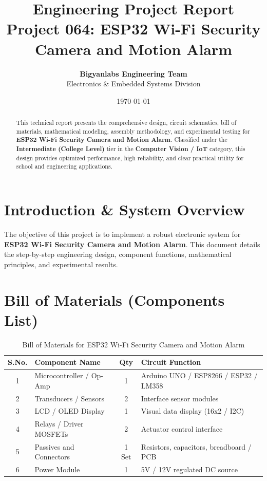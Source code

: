 \documentclass[11pt,a4paper]{article}
\title{\textbf{\Huge Engineering Project Report}\\[0.5em] \Large Project 064: ESP32 Wi-Fi Security Camera and Motion Alarm}
\author{\textbf{Bigyanlabs Engineering Team}\\ Electronics \& Embedded Systems Division}
\date{\today}
\begin{document}
\maketitle
\thispagestyle{empty}

\begin{abstract}
This technical report presents the comprehensive design, circuit schematics, bill of materials, mathematical modeling, assembly methodology, and experimental testing for \textbf{ESP32 Wi-Fi Security Camera and Motion Alarm}. Classified under the \textbf{Intermediate (College Level)} tier in the \textbf{Computer Vision / IoT} category, this design provides optimized performance, high reliability, and clear practical utility for school and engineering applications.
\end{abstract}

\newpage
\tableofcontents
\newpage

\section{Introduction \& System Overview}
The objective of this project is to implement a robust electronic system for \textbf{ESP32 Wi-Fi Security Camera and Motion Alarm}. This document details the step-by-step engineering design, component functions, mathematical principles, and experimental results.

\section{Bill of Materials (Components List)}
\begin{table}[h!]
\centering
\caption{Bill of Materials for ESP32 Wi-Fi Security Camera and Motion Alarm}
\vspace{0.5em}
\begin{tabular}{clcp{7cm}}
\toprule
\textbf{S.No.} & \textbf{Component Name} & \textbf{Qty} & \textbf{Circuit Function} \\
\midrule
1 & Microcontroller / Op-Amp & 1 & Arduino UNO / ESP8266 / ESP32 / LM358 \\
2 & Transducers / Sensors & 2 & Interface sensor modules \\
3 & LCD / OLED Display & 1 & Visual data display (16x2 / I2C) \\
4 & Relays / Driver MOSFETs & 2 & Actuator control interface \\
5 & Passives and Connectors & 1 Set & Resistors, capacitors, breadboard / PCB \\
6 & Power Module & 1 & 5V / 12V regulated DC source \\
\bottomrule
\end{tabular}
\end{table}
\end{document}
